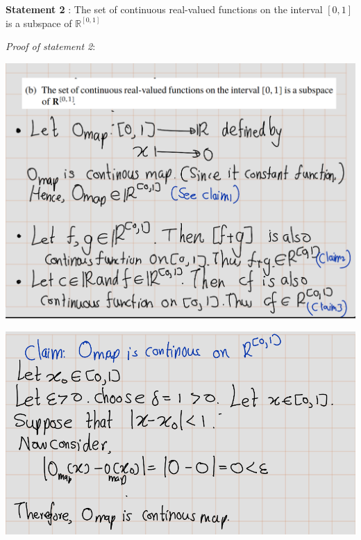 \documentclass[
]{book}
\theoremstyle{definition}
\theoremstyle{definition}
\theoremstyle{definition}
\theoremstyle{definition}
\theoremstyle{remark}
\begin{document}
\textbf{Statement 2} : The set of continuous real-valued functions on the interval \([0, 1]\) is a subspace of \(\mathbb{R}^[0,1]\)

\emph{Proof of statement 2}:

\includegraphics[width=15.81in]{fig/Ex1C/Ex2-1}

\includegraphics[width=12.39in]{fig/Ex1C/Ex2-2}
\end{document}
